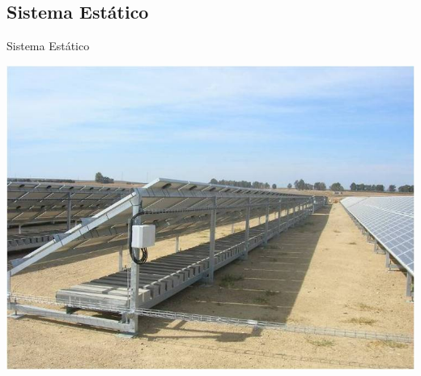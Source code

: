\documentclass[xcolor={usenames,svgnames,dvipsnames}]{beamer}
\begin{document}
\subsection{Sistema Estático}
\label{sec:org02981bb}

\begin{frame}[label={sec:orga193a0c}]{Sistema Estático}
\begin{center}
\includegraphics[width=.9\linewidth]{../figs/EstructuraEstaticaSuelo.jpg}
\end{center}
\end{frame}
\end{document}
